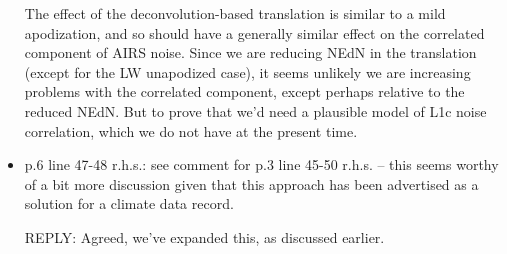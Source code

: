 \documentclass[11pt]{article}
\newcommand {\reply} {\mbox{\small REPLY}}
\begin{document}
\begin{itemize}
  The effect of the deconvolution-based translation is similar to a
  mild apodization, and so should have a generally similar effect on
  the correlated component of AIRS noise.  Since we are reducing
  NEdN in the translation (except for the LW unapodized case), it
  seems unlikely we are increasing problems with the correlated
  component, except perhaps relative to the reduced NEdN.  But to
  prove that we'd need a plausible model of L1c noise correlation,
  which we do not have at the present time.


% 
% 

\item p.6 line 47-48 r.h.s.: see comment for p.3 line 45-50 r.h.s. –
  this seems worthy of a bit more discussion given that this
  approach has been advertised as a solution for a climate data
  record.

  \reply: Agreed, we've expanded this, as discussed earlier.


\end{itemize}
\end{document}
